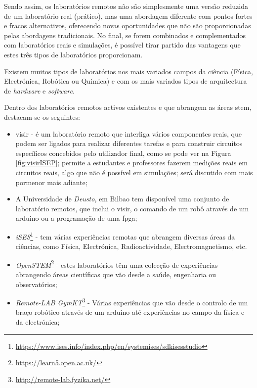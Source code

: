 Sendo assim, os laboratórios remotos não são simplesmente uma versão reduzida de um laboratório real (prático), mas uma abordagem diferente com pontos fortes e fracos alternativos, oferecendo novas oportunidades que não são proporcionadas pelas abordagens tradicionais. No final, se forem combinados e complementados com laboratórios reais e simulações, é possível tirar partido das vantagens que estes três tipos de laboratórios proporcionam.

Existem muitos tipos de laboratórios nos mais variados campos da ciência (Física, Electrónica, Robótica ou Química) e com os mais variados tipos de arquitectura de \textit{hardware} e \textit{software}. 

Dentro dos laboratórios remotos activos existentes e que abrangem as áreas \acrshort{stem}, destacam-se os seguintes:
\begin{itemize}
    \item \acrshort{visir} - é um \acrshort{laboratório remoto} que interliga vários componentes reais, que podem ser ligados para realizar diferentes tarefas e para construir circuitos específicos concebidos pelo utilizador final, como se pode ver na Figura \ref{fig:visirISEP}; permite a estudantes e professores fazerem medições reais em circuitos reais, algo que não é possível em simulações; será discutido com mais pormenor mais adiante;
    \item A Universidade de \textit{Deusto}, em Bilbao tem disponível uma conjunto de \acrshort{laboratório remoto}s, que inclui o \acrshort{visir}, o comando de um robô através de um \gls{arduino} ou a programação de uma \acrfull{fpga};
    \item \textit{iSES}\footnote{\url{https://www.ises.info/index.php/en/systemises/sdkisesstudio}} - tem várias experiências remotas que abrangem diversas áreas da ciências, como Física, Electrónica, Radioactividade, Electromagnetismo, etc.
    \item \textit{OpenSTEM}\footnote{\url{https://learn5.open.ac.uk/}} - estes laboratórios têm uma colecção de experiências abrangendo áreas científicas que vão desde a saúde, engenharia ou observatórios;
    \item \textit{Remote-LAB GymKT}\footnote{\url{http://remote-lab.fyzika.net/}} - Várias experiências que vão desde o controlo de um braço robótico através de um \gls{arduino} até experiências no campo da física e da electrónica;
\end{itemize}

